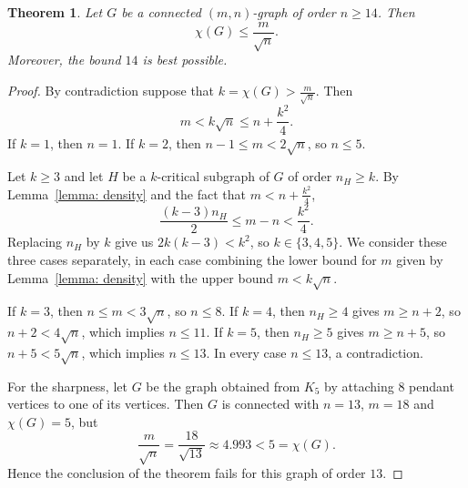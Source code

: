 \documentclass[10pt,a4paper]{amsart}
\newtheorem{theorem}{Theorem}
\begin{document}
\begin{theorem} \label{theorem: no ceiling}
Let $G$ be a connected $(m,n)$-graph of order $n \geq 14$. Then
\[
  \chi(G) \leq \frac{m}{\sqrt{n}} .
\]
Moreover, the bound $14$ is best possible.
\end{theorem}

\begin{proof}
By contradiction suppose that $k = \chi(G) > \frac{m}{\sqrt{n}}$. Then
$$
m < k\sqrt{n} \leq n + \frac{k^2}{4}.
$$
If $k = 1$, then $n = 1$. If $k = 2$, then $n-1 \leq m < 2\sqrt{n}$, so $n \leq 5$.

Let $k \geq 3$ and let $H$ be a $k$-critical subgraph of $G$ of order $n_H \geq k$. By Lemma~\ref{lemma: density} and the fact that $m < n + \frac{k^2}{4}$,
$$
\frac{(k-3)n_H}{2} \leq m-n < \frac{k^2}{4}.
$$
Replacing $n_H$ by $k$ give us $2k(k-3) < k^2$, so $k \in \{3,4,5\}$. We consider these three cases separately, in each case combining the lower bound for $m$ given by Lemma~\ref{lemma: density} with the upper bound $m < k\sqrt{n}$.

If $k=3$, then $n \leq m < 3\sqrt{n}$, so $n \leq 8$.
If $k=4$, then $n_H \geq 4$ gives $m \geq n+2$, so $n + 2 < 4\sqrt{n}$, which implies $n \leq 11$.
If $k=5$, then $n_H \geq 5$ gives $m \geq n+5$, so $n+5 < 5\sqrt{n}$, which implies $n \leq 13$.
In every case $n \leq 13$, a contradiction.

For the sharpness, let $G$ be the graph obtained from $K_5$ by attaching $8$ pendant vertices to one of its vertices. Then $G$ is connected with $n = 13$, $m = 18$ and $\chi(G) = 5$, but
$$\frac{m}{\sqrt{n}} = \frac{18}{\sqrt{13}} \approx 4.993 < 5 = \chi(G).$$
Hence the conclusion of the theorem fails for this graph of order $13$.
\end{proof}
\end{document}
